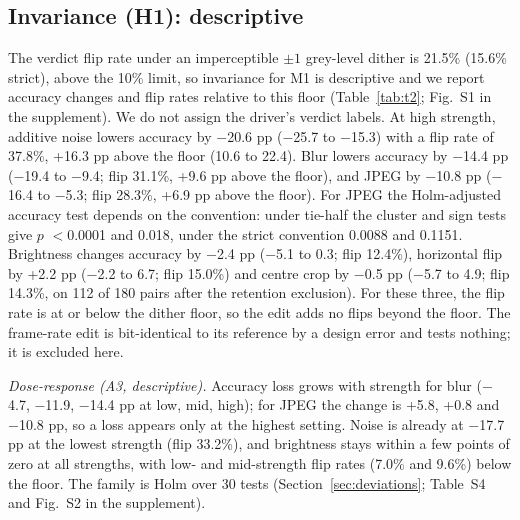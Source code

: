 \subsection{Invariance (H1): descriptive}
\label{sec:res-h1}
The verdict flip rate under an imperceptible $\pm1$ grey-level dither is 21.5\% (15.6\% strict), above the 10\% limit, so invariance for M1 is descriptive and we report accuracy changes and flip rates relative to this floor (Table~\ref{tab:t2}; Fig.~S1 in the supplement). We do not assign the driver's verdict labels. At high strength, additive noise lowers accuracy by $-$20.6 pp ($-$25.7 to $-$15.3) with a flip rate of 37.8\%, +16.3 pp above the floor (10.6 to 22.4). Blur lowers accuracy by $-$14.4 pp ($-$19.4 to $-$9.4; flip 31.1\%, +9.6 pp above the floor), and JPEG by $-$10.8 pp ($-$16.4 to $-$5.3; flip 28.3\%, +6.9 pp above the floor). For JPEG the Holm-adjusted accuracy test depends on the convention: under tie-half the cluster and sign tests give $p$ $<$0.0001 and 0.018, under the strict convention 0.0088 and 0.1151. Brightness changes accuracy by $-$2.4 pp ($-$5.1 to 0.3; flip 12.4\%), horizontal flip by +2.2 pp ($-$2.2 to 6.7; flip 15.0\%) and centre crop by $-$0.5 pp ($-$5.7 to 4.9; flip 14.3\%, on 112 of 180 pairs after the retention exclusion). For these three, the flip rate is at or below the dither floor, so the edit adds no flips beyond the floor. The frame-rate edit is bit-identical to its reference by a design error and tests nothing; it is excluded here.

\emph{Dose-response (A3, descriptive).} Accuracy loss grows with strength for blur ($-$4.7, $-$11.9, $-$14.4 pp at low, mid, high); for JPEG the change is +5.8, +0.8 and $-$10.8 pp, so a loss appears only at the highest setting. Noise is already at $-$17.7 pp at the lowest strength (flip 33.2\%), and brightness stays within a few points of zero at all strengths, with low- and mid-strength flip rates (7.0\% and 9.6\%) below the floor. The family is Holm over 30 tests (Section~\ref{sec:deviations}; Table~S4 and Fig.~S2 in the supplement).


